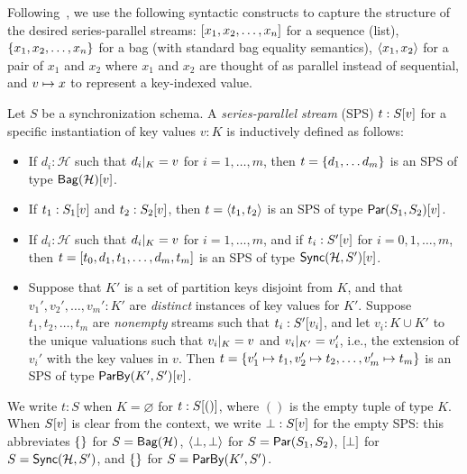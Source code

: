 Following~, we use the following syntactic constructs to capture the structure of the desired series-parallel streams: $\spsseq{x_1, x_2, \ldots, x_n}$ for
a sequence (list), $\spsbag{x_1, x_2, \ldots, x_n}$ for a bag (with standard bag
equality semantics), $\spspargen{x_1, x_2}$ for a pair of $x_1$ and $x_2$ where
$x_1$ and $x_2$ are thought of as parallel instead of sequential,
and $\keyed{v}{x}$ to represent a key-indexed value.

\begin{definition}
\label{45:def:trace}
Let $S$ be a synchronization schema.
A \emph{series-parallel stream} (SPS) $t : \spstype{v}{S}$ for a specific instantiation of key values $v : K$ is inductively defined as follows:
\begin{itemize}
\item
If $d_i : \mathcal{H}$ such that $\tuprestrict{d_i}{K} = v$
for $i = 1, \ldots, m$,
then $t = \spsbag{d_1, \ldots d_m}$
is an SPS of type $\spstype{v}{\relleaf{\mathcal{H}}}$.
\item
If $t_1 : \spstype{v}{S_1}$
and $t_2 : \spstype{v}{S_2}$,
then $t = \spspar{t_1}{t_2}$
is an SPS of type $\spstype{v}{\parcomp{S_1}{S_2}}$.
\item
If $d_i : \mathcal{H}$ such that $\tuprestrict{d_i}{K} = v$
for $i = 1, \ldots, m$,
and if $t_i: \spstype{v}{S'}$ for $i = 0, 1, \ldots, m$,
then
$t = \spsseq{t_0, d_1, t_1, \ldots, d_m, t_m}$
is an SPS of type $\spstype{v}{\hier{\mathcal{H}}{S'}}$.
\item
Suppose that $K'$ is a set of partition keys disjoint from $K$,
and that $v_1', v_2', \ldots, v_m': K'$ are \emph{distinct} instances
of key values for $K'$.
Suppose $t_1, t_2, \ldots, t_m$ are \emph{nonempty} streams such that
$t_i: \spstype{v_i}{S'}$,
and let $v_i: K \cup K'$ to the unique valuations
such that $\tuprestrict{v_i}{K} = v$ and $\tuprestrict{v_i}{K'} = v_i'$,
i.e., the extension of $v_i'$ with the key values in $v$.
Then
$t = \spsbag{\keyed{v_1'}{t_1}, \keyed{v_2'}{t_2}, \ldots, \keyed{v_m'}{t_m}}$
is an SPS of type
$\spstype{v}{\keyby{K'}{S'}}$.
\end{itemize}
\end{definition}

We write $t: S$ when $K = \varnothing$ for $t: \spstype{()}{S}$, where $()$ is the empty tuple of type $K$.
When $\spstype{v}{S}$ is clear from the context,
we write $\spsemp: \spstype{v}{S}$ for the empty SPS:
this abbreviates $\spsbag{}$ for $S = \relleaf{\mathcal{H}}$,
$\spspar{\spsemp}{\spsemp}$ for $S = \parcomp{S_1}{S_2}$,
$\spsseq{\bot}$ for $S = \hier{\mathcal{H}}{S'}$,
and $\spsbag{}$ for $S = \keyby{K'}{S'}$.

